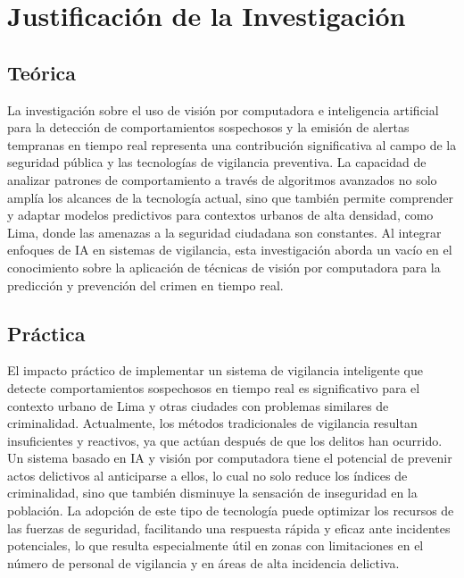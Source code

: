 \section{Justificación de la Investigación}

\subsection{Teórica}
La investigación sobre el uso de visión por computadora e inteligencia artificial para la detección de comportamientos sospechosos y la emisión de alertas tempranas en tiempo real representa una contribución significativa al campo de la seguridad pública y las tecnologías de vigilancia preventiva. La capacidad de analizar patrones de comportamiento a través de algoritmos avanzados no solo amplía los alcances de la tecnología actual, sino que también permite comprender y adaptar modelos predictivos para contextos urbanos de alta densidad, como Lima, donde las amenazas a la seguridad ciudadana son constantes. Al integrar enfoques de IA en sistemas de vigilancia, esta investigación aborda un vacío en el conocimiento sobre la aplicación de técnicas de visión por computadora para la predicción y prevención del crimen en tiempo real.

\subsection{Práctica}
El impacto práctico de implementar un sistema de vigilancia inteligente que detecte comportamientos sospechosos en tiempo real es significativo para el contexto urbano de Lima y otras ciudades con problemas similares de criminalidad. Actualmente, los métodos tradicionales de vigilancia resultan insuficientes y reactivos, ya que actúan después de que los delitos han ocurrido. Un sistema basado en IA y visión por computadora tiene el potencial de prevenir actos delictivos al anticiparse a ellos, lo cual no solo reduce los índices de criminalidad, sino que también disminuye la sensación de inseguridad en la población. La adopción de este tipo de tecnología puede optimizar los recursos de las fuerzas de seguridad, facilitando una respuesta rápida y eficaz ante incidentes potenciales, lo que resulta especialmente útil en zonas con limitaciones en el número de personal de vigilancia y en áreas de alta incidencia delictiva.

